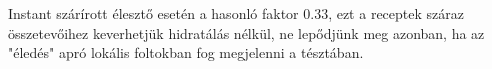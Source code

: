 Instant szárírott élesztő esetén a hasonló faktor \num{0.33}, ezt a receptek száraz összetevőihez keverhetjük hidratálás nélkül, ne lepődjünk meg azonban, ha az "éledés" apró lokális foltokban fog megjelenni a tésztában.~\cite{kab_eleszto_atvaltas}






